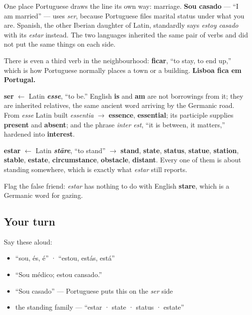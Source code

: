 One place Portuguese draws the line its own way: marriage. \textbf{Sou casado} — \textquotedblleft{}I am married\textquotedblright{} — uses \emph{ser}, because Portuguese files marital status under what you are. Spanish, the other Iberian daughter of Latin, standardly says \emph{estoy casado} with its \emph{estar} instead. The two languages inherited the same pair of verbs and did not put the same things on each side.

There is even a third verb in the neighbourhood: \textbf{ficar}, \textquotedblleft{}to stay, to end up,\textquotedblright{} which is how Portuguese normally places a town or a building. \textbf{Lisboa fica em Portugal.}

\begin{cousinweb}
\textbf{ser} $\leftarrow$ Latin \emph{\textbf{esse}}, \textquotedblleft{}to be.\textquotedblright{} English \textbf{is} and \textbf{am} are not borrowings from it; they are inherited relatives, the same ancient word arriving by the Germanic road. From \emph{esse} Latin built \emph{essentia} $\to$ \textbf{essence}, \textbf{essential}; its participle supplies \textbf{present} and \textbf{absent}; and the phrase \emph{inter est}, \textquotedblleft{}it is between, it matters,\textquotedblright{} hardened into \textbf{interest}.

\textbf{estar} $\leftarrow$ Latin \emph{\textbf{stāre}}, \textquotedblleft{}to stand\textquotedblright{} $\to$ \textbf{stand}, \textbf{state}, \textbf{status}, \textbf{statue}, \textbf{station}, \textbf{stable}, \textbf{estate}, \textbf{circumstance}, \textbf{obstacle}, \textbf{distant}. Every one of them is about standing somewhere, which is exactly what \emph{estar} still reports.

Flag the false friend: \emph{estar} has nothing to do with English \textbf{stare}, which is a Germanic word for gazing.
\end{cousinweb}

\subsection*{Your turn}
Say these aloud:

\begin{itemize}
\raggedright
  \item \textquotedblleft{}sou, és, é\textquotedblright{} · \textquotedblleft{}estou, estás, está\textquotedblright{}
  \item \textquotedblleft{}Sou médico; estou cansado.\textquotedblright{}
  \item \textquotedblleft{}Sou casado\textquotedblright{} — Portuguese puts this on the \emph{ser} side
  \item the standing family — \textquotedblleft{}estar · state · status · estate\textquotedblright{}
\end{itemize}

